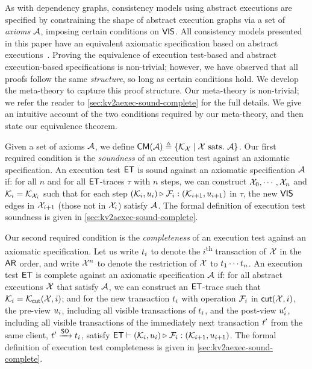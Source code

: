 As with dependency graphs, consistency models using abstract executions are specified by constraining the shape of abstract execution graphs via a set of \emph{axioms} $\mathcal{A}$, \eg imposing certain conditions on $\mathsf{VIS}$. %
All consistency models presented in this paper have an equivalent axiomatic specification based on abstract executions~\cite{framework-concur,laws}. 
Proving the equivalence of execution test-based and abstract execution-based specifications is non-trivial; 
however, we have observed that all proofs follow the same \emph{structure}, so long as certain conditions hold. 
We develop the meta-theory to capture this proof structure.
Our meta-theory is non-trivial; we refer the reader to \cref{sec:kv2aexec-sound-complete} for the full details. 
We give an intuitive account of the two conditions required by our meta-theory, and then state our equivalence theorem. 

Given a set of axioms $\mathcal{A}$, we define $\mathsf{CM}(\mathcal{A}) \triangleq \{\mathcal{K}_{\mathcal{X}} \mid \mathcal{X} \text{ sats.\ } \mathcal{A} \}$.
Our first required condition is the \emph{soundness} of an execution test against an axiomatic specification.
An execution test $\mathsf{ET}$ is sound against an axiomatic specification $\mathcal{A}$ if:
for all $n$ and for all \( \mathsf{ET} \)-traces \( \tau \) with \( n \) steps, 
we can construct $\mathcal{X}_0, \cdots, \mathcal{X}_n$ and \( \mathcal{K}_i = \mathcal{K}_{\mathcal{X}_i} \) such that 
for each step \( (\mathcal{K}_i, u_i) \triangleright_{} \mathcal{F}_i : (\mathcal{K}_{i+1}, u_{i+1}) \) in \( \tau \),
the new $\mathsf{VIS}$ edges in \( \mathcal{X}_{i+1} \) (those not in $\mathcal{X}_i$)
satisfy \( \mathcal{A} \).
The formal definition of execution test soundness is given in \cref{sec:kv2aexec-sound-complete}.
%

Our second required condition is the \emph{completeness} of an execution test against an axiomatic specification.
Let us write $t_i$ to denote the $i$\textsuperscript{th} transaction of $\mathcal{X}$ in the $\mathsf{AR}$ order, and write $\mathcal{X}^{n}$ to denote the restriction of $\mathcal{X}$ to $t_1 \cdots t_n$. 
An execution test $\mathsf{ET}$ is complete against an axiomatic specification $\mathcal{A}$ if:
for all abstract executions \( \mathcal{X} \) that satisfy \( \mathcal{A} \), 
we can construct an \( \mathsf{ET} \)-trace such that \( \mathcal{K}_i = \mathcal{K}_{\mathsf{cut}}(\mathcal{X},i) \); and
for the new transaction \( t_i \) with operation \( \mathcal{F}_i \) in \( \mathsf{cut}(\mathcal{X},i) \),
the pre-view \( u_i \), including all visible transactions of \( t_i \),
and the post-view \( u'_i \), including all visible transactions of the immediately next transaction \( t' \) from the same client, \( t' \xrightarrow{\mathsf{SO}} t_i \),
satisfy
\( \mathsf{ET} \vdash (\mathcal{K}_i, u_i) \triangleright_{} \mathcal{F}_i : (\mathcal{K}_{i+1}, u_{i+1}) \).
The formal definition of execution test completeness is given in \cref{sec:kv2aexec-sound-complete}.
%

